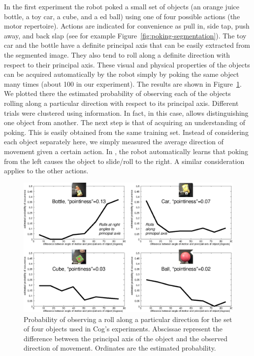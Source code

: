 In the first experiment the robot poked a small set of objects 
(an orange juice bottle, a toy car, a cube, and a \ahhcolor{}ed ball) using 
one of four possible actions (the motor repertoire). Actions are 
indicated for convenience as pull in, side tap, push away, and back 
slap (see for example Figure~\ref{fig:poking-segmentation}). 
The toy car and the bottle have a definite principal axis that 
can be easily extracted from the segmented image. They also tend to 
roll along a definite direction with respect to their principal axis. 
These visual and physical properties of the objects can be acquired 
automatically by the robot simply by poking the same object many times 
(about 100 in our experiment). The results are shown in 
Figure~\ref{fig:affordances}. We plotted there the estimated probability 
of observing each of the objects rolling along a particular direction 
with respect to its principal axis. Different trials were clustered 
using \ahhcolor{} information. In fact, in this case, \ahhcolor{} allows 
distinguishing one object from another. The next step is that of 
acquiring an understanding of poking. This is easily obtained from 
the same training set. Instead of considering each object separately 
here, we simply measured the average direction of movement given a 
certain action. In \ahhpractice{}, the robot automatically learns that 
poking from the left causes the object to slide/roll to the right. 
A similar consideration applies to the other actions.

%
%
\begin{figure}[tb]
\begin{center}
\includegraphics[width=\columnwidth]{affordances.eps}
\caption{ 
\label{fig:affordances}
%
%
Probability of observing a roll along a particular direction for the set of
four objects used in Cog's experiments. Abscissae represent the difference
between the principal axis of the object and the observed direction of movement.
Ordinates are the estimated probability.
}
\end{center}
\end{figure}
%
%

